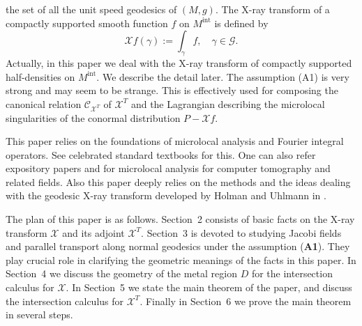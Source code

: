 \documentclass[a4paper,11pt,reqno]{amsart}
\numberwithin{equation}{section}
\theoremstyle{definition}
\theoremstyle{remark}
\begin{document}
the set of all the unit speed geodesics of $(M,g)$. 
The X-ray transform of a compactly supported smooth function $f$ on 
$M^\text{int}$ is defined by 
%
%
$$
\mathcal{X}f(\gamma)
:=
\int_\gamma f,
\quad
\gamma \in \mathscr{G}. 
$$
%
%
Actually, in this paper we deal with the X-ray transform of 
compactly supported half-densities on $M^\text{int}$. 
We describe the detail later. 
The assumption (A1) is very strong and may seem to be strange. 
This is effectively used for composing the canonical relation 
$\mathcal{C}_{\mathcal{X}^T}$ of $\mathcal{X}^T$ 
and the Lagrangian describing the microlocal singularities of the conormal distribution $P-\mathcal{X}f$. 
%
%
\par
%
%
This paper relies on the foundations of microlocal analysis and Fourier integral operators. 
See celebrated standard textbooks \cite{Duistermaat,GrigisSjoestrand,Hoermander1,Hoermander2,Hoermander3,Hoermander4} for this. One can also refer expository papers \cite{KrishnanQuinto} and \cite[Section~2]{WebberHolmanQuinto} 
for microlocal analysis for computer tomography and related fields. 
Also this paper deeply relies on the methods and the ideas dealing with the geodesic X-ray transform developed by Holman and Uhlmann in \cite{HolmanUhlmann}. 
%
%
\par
%
%
The plan of this paper is as follows. 
Section~2 consists of basic facts on the X-ray transform $\mathcal{X}$ and its adjoint $\mathcal{X}^T$. 
Section~3 is devoted to studying Jacobi fields and parallel transport along normal geodesics under the assumption ({\bf A1}). 
They play crucial role in clarifying the geometric meanings of the facts in this paper. 
In Section~4 we discuss the geometry of the metal region $D$ for the intersection calculus for $\mathcal{X}$. 
In Section~5 we state the main theorem of the paper, and discuss the intersection calculus for $\mathcal{X}^T$. 
Finally in Section~6 we prove the main theorem in several steps. 
\end{document}

